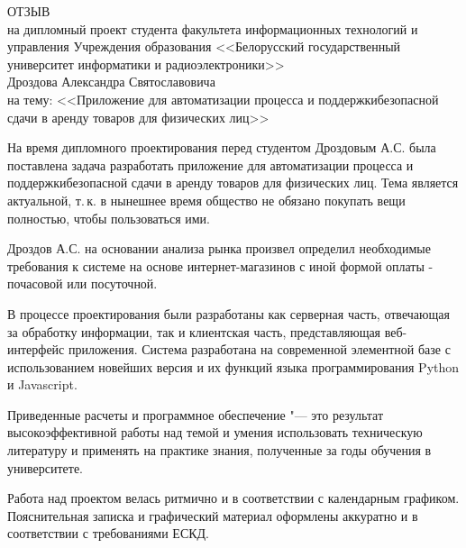 
\thispagestyle{empty}

\begin{singlespace}

{\small
  \begin{center}
    \begin{minipage}{0.8\textwidth}
      \begin{center}
        {\normalsize ОТЗЫВ}\\[1em]
        на дипломный проект студента факультета информационных технологий
        и управления Учреждения образования <<Белорусский государственный университет информатики и радиоэлектроники>>\\
        Дроздова Александра Святославовича \\
        на тему: <<Приложение для автоматизации процесса и поддержкибезопасной сдачи в аренду товаров для физических лиц>>
      \end{center}
    \end{minipage}
  \end{center}

На время дипломного проектирования перед студентом Дроздовым А.С. была поставлена задача разработать приложение для автоматизации процесса и поддержкибезопасной сдачи в аренду товаров для физических лиц.
Тема является актуальной, т.\,к. в нынешнее время общество не обязано покупать вещи полностью, чтобы пользоваться ими.

Дроздов А.С. на основании анализа рынка произвел определил необходимые требования к системе на основе интернет-магазинов с иной формой оплаты - почасовой или посуточной.

В процессе проектирования были разработаны как серверная часть, отвечающая за обработку информации, так и клиентская часть, представляющая веб-интерфейс приложения.
Система разработана на современной элементной базе с использованием новейших версия и их функций языка программирования Python и Javascript.

Приведенные расчеты и программное обеспечение "--- это результат высокоэффективной работы над темой и умения использовать техническую литературу и применять на практике знания, полученные за годы обучения в университете.

Работа над проектом велась ритмично и в соответствии с календарным графиком.
Пояснительная записка и графический материал оформлены аккуратно и в соответствии с требованиями ЕСКД.

}
\end{singlespace}
